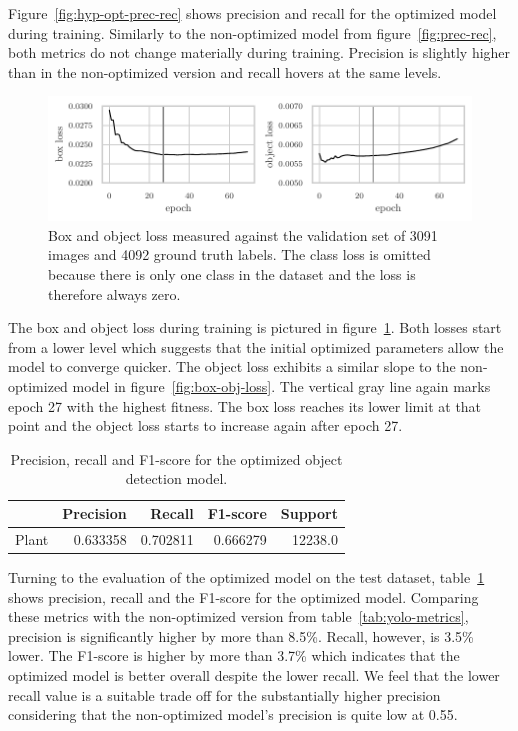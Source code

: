 \documentclass[draft,final]{vutinfth} %
\begin{document}
Figure~\ref{fig:hyp-opt-prec-rec} shows precision and recall for the
optimized model during training. Similarly to the non-optimized model
from figure~\ref{fig:prec-rec}, both metrics do not change materially
during training. Precision is slightly higher than in the
non-optimized version and recall hovers at the same levels.

\begin{figure}
  \centering
  \includegraphics{graphics/val_box_obj_loss_final.pdf}
  \caption[Hyper-parameter optimized object detection box and object
  loss.]{Box and object loss measured against the validation set of
    3091 images and 4092 ground truth labels. The class loss is
    omitted because there is only one class in the dataset and the
    loss is therefore always zero.}
  \label{fig:hyp-opt-box-obj-loss}
\end{figure}

The box and object loss during training is pictured in
figure~\ref{fig:hyp-opt-box-obj-loss}. Both losses start from a lower
level which suggests that the initial optimized parameters allow the
model to converge quicker. The object loss exhibits a similar slope to
the non-optimized model in figure~\ref{fig:box-obj-loss}. The vertical
gray line again marks epoch 27 with the highest fitness. The box loss
reaches its lower limit at that point and the object loss starts to
increase again after epoch 27.

\begin{table}[h]
  \centering
  \begin{tabular}{lrrrr}
    \toprule
    {} &  Precision &    Recall &  F1-score &  Support \\
    \midrule
    Plant        &   0.633358 &  0.702811 &  0.666279 &  12238.0 \\
    \bottomrule
  \end{tabular}
  \caption{Precision, recall and F1-score for the optimized object
    detection model.}
  \label{tab:yolo-metrics-hyp}
\end{table}

Turning to the evaluation of the optimized model on the test dataset,
table~\ref{tab:yolo-metrics-hyp} shows precision, recall and the
F1-score for the optimized model. Comparing these metrics with the
non-optimized version from table~\ref{tab:yolo-metrics}, precision is
significantly higher by more than 8.5\%. Recall, however, is 3.5\%
lower. The F1-score is higher by more than 3.7\% which indicates that
the optimized model is better overall despite the lower recall. We
feel that the lower recall value is a suitable trade off for the
substantially higher precision considering that the non-optimized
model's precision is quite low at 0.55.
\end{document}

